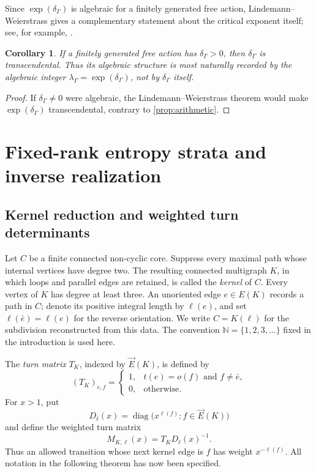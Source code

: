 \documentclass[11pt]{amsart}
\theoremstyle{plain}
\newtheorem{corollary}[theorem]{Corollary}
\theoremstyle{definition}
\theoremstyle{remark}
\begin{document}
Since \(\exp(\delta_\Gamma)\) is algebraic for a finitely generated free
action, Lindemann--Weierstrass gives a complementary statement about the
critical exponent itself; see, for example, \cite{Baker1990}.

\begin{corollary}\label{cor:transcendental-delta}
If a finitely generated free action has \(\delta_\Gamma>0\), then
\(\delta_\Gamma\) is transcendental.  Thus its algebraic structure is most
naturally recorded by the algebraic integer
\(\lambda_\Gamma=\exp(\delta_\Gamma)\), not by \(\delta_\Gamma\) itself.
\end{corollary}

\begin{proof}
If \(\delta_\Gamma\neq0\) were algebraic, the Lindemann--Weierstrass theorem
would make \(\exp(\delta_\Gamma)\) transcendental, contrary to
\cref{prop:arithmetic}.
\end{proof}

\section{Fixed-rank entropy strata and inverse realization}
\label{sec:inverse}

\subsection{Kernel reduction and weighted turn determinants}

Let \(C\) be a finite connected non-cyclic core.  Suppress every maximal
path whose internal vertices have degree two.  The resulting connected
multigraph \(K\), in which loops and parallel edges are retained, is called
the \emph{kernel} of \(C\).  Every vertex of \(K\) has degree at least three.
An unoriented edge \(e\in E(K)\) records a path in \(C\); denote its positive
integral length by \(\ell(e)\), and set
\(\ell(\bar e)=\ell(e)\) for the reverse orientation.  We write
\(C=K(\ell)\) for the subdivision reconstructed from this data.
The convention \(\mathbb N=\{1,2,3,\ldots\}\) fixed in the
introduction is used here.

The \emph{turn matrix} \(T_K\), indexed by \(\vec E(K)\), is defined by
\[
  (T_K)_{e,f}
  =
  \begin{cases}
    1,&t(e)=o(f)\text{ and }f\neq\bar e,\\
    0,&\text{otherwise}.
  \end{cases}
\]
For \(x>1\), put
\[
  D_\ell(x)
  =\operatorname{diag}\bigl(x^{\ell(f)}:f\in\vec E(K)\bigr)
\]
and define the weighted turn matrix
\begin{equation}\label{eq:weighted-turn}
  M_{K,\ell}(x)=T_KD_\ell(x)^{-1}.
\end{equation}
Thus an allowed transition whose next kernel edge is \(f\) has weight
\(x^{-\ell(f)}\).  All notation in the following theorem has now been
specified.
\end{document}
